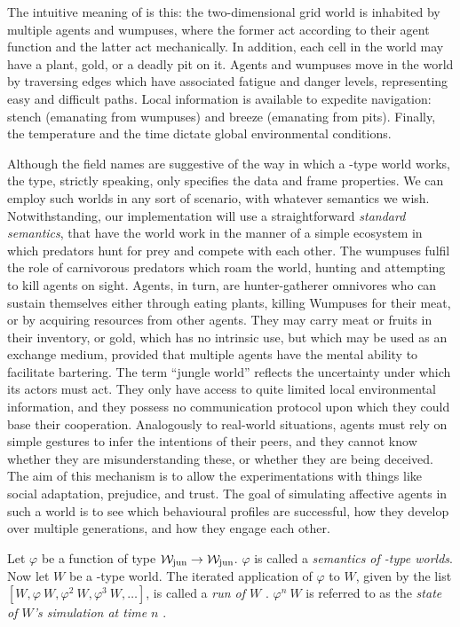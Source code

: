 The intuitive meaning of \wjun is this: the two-dimensional grid world is inhabited by multiple agents and wumpuses, where the former act according to their agent function and the latter act mechanically. In addition, each cell in the world may have a plant, gold, or a deadly pit on it. Agents and wumpuses move in the world by traversing edges which have associated fatigue and danger levels, representing easy and difficult paths. Local information is available to expedite navigation: stench (emanating from wumpuses) and breeze (emanating from pits). Finally, the temperature and the time dictate global environmental conditions.

Although the field names are suggestive of the way in which a \wjun-type world works, the type, strictly speaking, only specifies the data and frame properties. We can employ such worlds in any sort of scenario, with whatever semantics we wish. Notwithstanding, our implementation will use a straightforward {\em standard semantics}, that have the world work in the manner of a simple ecosystem in which predators hunt for prey and compete with each other. The wumpuses fulfil the role of carnivorous predators which roam the world, hunting and attempting to kill agents on sight. Agents, in turn, are hunter-gatherer omnivores who can sustain themselves either through eating plants, killing Wumpuses for their meat, or by acquiring resources from other agents. They may carry meat or fruits in their inventory, or gold, which has no intrinsic use, but which may be used as an exchange medium, provided that multiple agents have the mental ability to facilitate bartering. The term ``jungle world'' reflects the uncertainty under which its actors must act. They only have access to quite limited local environmental information, and they possess no communication protocol upon which they could base their cooperation. Analogously to real-world situations, agents must rely on simple gestures to infer the intentions of their peers, and they cannot know whether they are misunderstanding these, or whether they are being deceived. The aim of this mechanism is to allow the experimentations with things like social adaptation, prejudice, and trust. The goal of simulating affective agents in such a world is to see which behavioural profiles are successful, how they develop over multiple generations, and how they engage each other.

\begin{definition}
Let $\varphi$ be a function of type $\mathcal{W}_{\mathrm{jun}} \rightarrow \mathcal{W}_{\mathrm{jun}}$. $\varphi$ is called a {\em semantics of \wjun-type worlds}.
Now let $W$ be a \wjun-type world. The iterated application of $\varphi$ to $W$, given by the list ${[W, \varphi\ W, \varphi^2\ W, \varphi^3\ W, \dots]}$, is called a {\em run of $W$ }. $\varphi^n\ W$ is referred to as the {\em state of $W$'s simulation at time $n$ }.
\end{definition}

